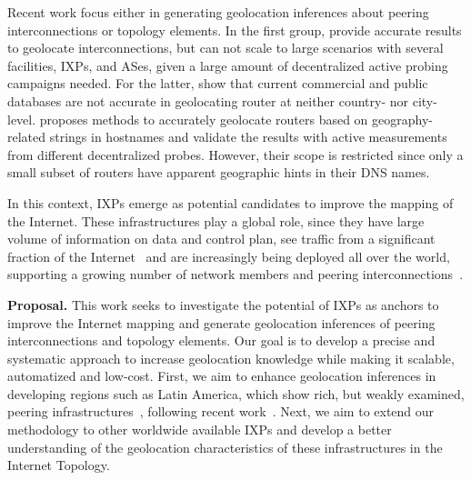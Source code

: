	Recent work focus either in generating geolocation inferences about peering interconnections or topology elements. In the first group, \cite{Giotsas:2015:MPI:2716281.2836122, Augustin:2009:IM:1644893.1644934} provide accurate results to geolocate interconnections, but can not scale to large scenarios with several facilities, IXPs, and ASes, given a large amount of decentralized active probing campaigns needed. For the latter, \cite{Gharaibeh:2017:LRG:3131365.3131380} show that current commercial and public databases are not accurate in geolocating router at neither country- nor city-level. \cite{Huffaker:2014:DDR:2656877.2656879, 8002903} proposes methods to accurately geolocate routers based on geography-related strings in hostnames and validate the results with active measurements from different decentralized probes. However, their scope is restricted since only a small subset of routers have apparent geographic hints in their DNS names.

	In this context, IXPs emerge as potential candidates to improve the mapping of the Internet. These infrastructures play a global role, since they have large volume of information on data and control plan, see traffic from a significant fraction of the Internet~\cite{Chatzis:2013:BUL:2504730.2504746} and are increasingly being deployed all over the world, supporting a growing number of network members and peering interconnections~\cite{Giotsas:2017:DPI:3098822.3098855}.
	


	\textbf{Proposal.} This work seeks to investigate the potential of IXPs as anchors to improve the Internet mapping and generate geolocation inferences of peering interconnections and topology elements. Our goal is to develop a precise and systematic approach to increase geolocation knowledge while making it scalable, automatized and low-cost. First, we aim to enhance geolocation inferences in developing regions such as Latin America, which show rich, but weakly examined, peering infrastructures~\cite{IXbr, DissectingBrazilianIXP}, following recent work~\cite{10.1007/978-3-319-15509-8_4, Fanou:2017:ICC:3131365.3131394}. Next, we aim to extend our methodology to other worldwide available IXPs and develop a better understanding of the geolocation characteristics of these infrastructures in the Internet Topology.

